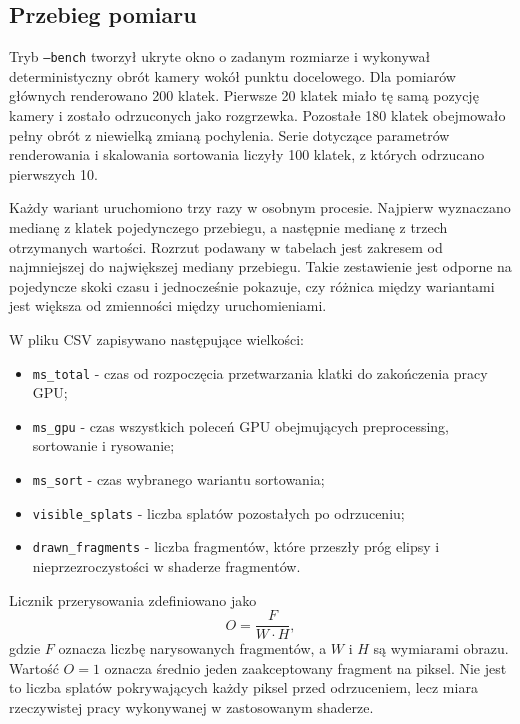 \subsection{Przebieg pomiaru}

Tryb \texttt{--bench} tworzył ukryte okno o zadanym rozmiarze i wykonywał deterministyczny obrót kamery wokół punktu docelowego. Dla pomiarów głównych renderowano 200 klatek. Pierwsze 20 klatek miało tę samą pozycję kamery i zostało odrzuconych jako rozgrzewka. Pozostałe 180 klatek obejmowało pełny obrót z niewielką zmianą pochylenia. Serie dotyczące parametrów renderowania i skalowania sortowania liczyły 100 klatek, z których odrzucano pierwszych 10.

Każdy wariant uruchomiono trzy razy w osobnym procesie. Najpierw wyznaczano medianę z klatek pojedynczego przebiegu, a następnie medianę z trzech otrzymanych wartości. Rozrzut podawany w tabelach jest zakresem od najmniejszej do największej mediany przebiegu. Takie zestawienie jest odporne na pojedyncze skoki czasu i jednocześnie pokazuje, czy różnica między wariantami jest większa od zmienności między uruchomieniami.

W pliku CSV zapisywano następujące wielkości:
\begin{itemize}
  \item \texttt{ms\_total} - czas od rozpoczęcia przetwarzania klatki do
        zakończenia pracy GPU;
  \item \texttt{ms\_gpu} - czas wszystkich poleceń GPU obejmujących
        preprocessing, sortowanie i rysowanie;
  \item \texttt{ms\_sort} - czas wybranego wariantu sortowania;
  \item \texttt{visible\_splats} - liczba splatów pozostałych po odrzuceniu;
  \item \texttt{drawn\_fragments} - liczba fragmentów, które przeszły próg
        elipsy i nieprzezroczystości w shaderze fragmentów.
\end{itemize}

Licznik przerysowania zdefiniowano jako
\begin{equation}
  O = \frac{F}{W\cdot H},
  \label{eq:overdraw}
\end{equation}
gdzie $F$ oznacza liczbę narysowanych fragmentów, a $W$ i $H$ są wymiarami obrazu. Wartość $O=1$ oznacza średnio jeden zaakceptowany fragment na piksel. Nie jest to liczba splatów pokrywających każdy piksel przed odrzuceniem, lecz miara rzeczywistej pracy wykonywanej w zastosowanym shaderze.

